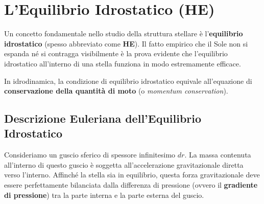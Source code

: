 \section{L'Equilibrio Idrostatico (HE)}

Un concetto fondamentale nello studio della struttura stellare è l'\textbf{equilibrio idrostatico} (spesso abbreviato come \textbf{HE}). Il fatto empirico che il Sole non si espanda né si contragga visibilmente è la prova evidente che l'equilibrio idrostatico all'interno di una stella funziona in modo estremamente efficace.

In idrodinamica, la condizione di equilibrio idrostatico equivale all'equazione di \textbf{conservazione della quantità di moto} (o \textit{momentum conservation}).

\subsection{Descrizione Euleriana dell'Equilibrio Idrostatico}

Consideriamo un guscio sferico di spessore infinitesimo $dr$. La massa contenuta all'interno di questo guscio è soggetta all'accelerazione gravitazionale diretta verso l'interno. Affinché la stella sia in equilibrio, questa forza gravitazionale deve essere perfettamente bilanciata dalla differenza di pressione (ovvero il \textbf{gradiente di pressione}) tra la parte interna e la parte esterna del guscio.

